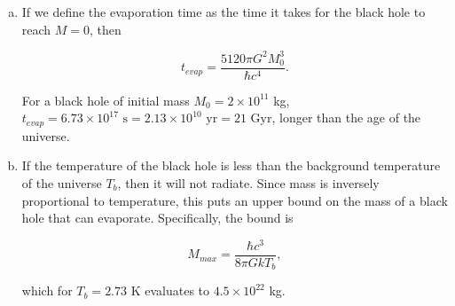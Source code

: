\documentclass{article}
\begin{document}
\begin{enumerate}
\begin{enumerate}[(a)]
		\item

		If we define the evaporation time as the time it takes for the black hole to reach $M=0$, then

		$$t_{evap} = \frac{5120 \pi G^2 M_0^3}{\hbar c^4}.$$

		For a black hole of initial mass $M_0 = 2 \times 10^{11}$ kg, $t_{evap} = 6.73 \times 10^{17} \text{ s} = 2.13 \times 10^{10} \text{ yr} = 21 \text{ Gyr}$, longer than the age of the universe.

		\item

		If the temperature of the black hole is less than the background temperature of the universe $T_b$, then it will not radiate. Since mass is inversely proportional to temperature, this puts an upper bound on the mass of a black hole that can evaporate. Specifically, the bound is

		$$M_{max} = \frac{\hbar c^3}{8 \pi G k T_b},$$

		which for $T_b = 2.73$ K evaluates to $4.5 \times 10^{22}$ kg.

	\end{enumerate}

\end{enumerate}
\end{document}
